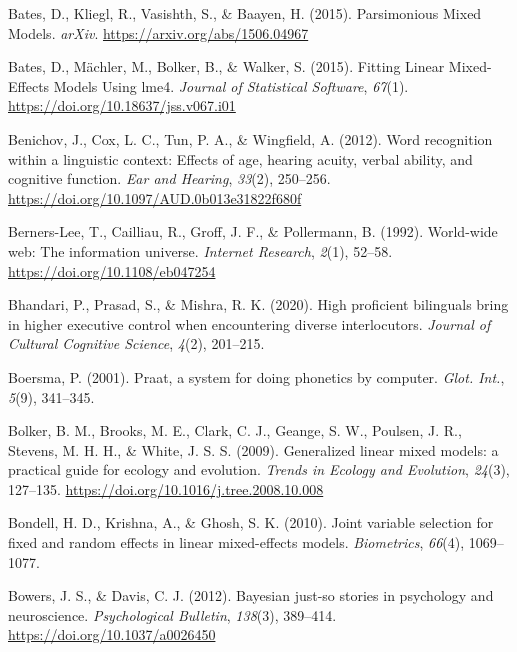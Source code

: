 \documentclass[a4paper, nobind]{templates/ociamthesis}
\newlength{\cslhangindent}
\newenvironment{CSLReferences}[2] %
 {%
  \setlength{\parindent}{0pt}
  \ifodd #1
  \let\oldpar\par
  \def\par{\hangindent=\cslhangindent\oldpar}
  \fi
  \setlength{\parskip}{1mm}
  \setlength{\baselineskip}{6mm}
 }%
 {}
\begin{document}
\begin{CSLReferences}{1}{0}
\leavevmode{}%
Bates, D., Kliegl, R., Vasishth, S., \& Baayen, H. (2015). {Parsimonious Mixed Models}. \emph{arXiv}. \url{https://arxiv.org/abs/1506.04967}

\leavevmode{}%
Bates, D., Mächler, M., Bolker, B., \& Walker, S. (2015). Fitting Linear Mixed-Effects Models Using lme4. \emph{Journal of Statistical Software}, \emph{67}(1). \url{https://doi.org/10.18637/jss.v067.i01}

\leavevmode{}%
Benichov, J., Cox, L. C., Tun, P. A., \& Wingfield, A. (2012). {Word recognition within a linguistic context: Effects of age, hearing acuity, verbal ability, and cognitive function}. \emph{Ear and Hearing}, \emph{33}(2), 250--256. \url{https://doi.org/10.1097/AUD.0b013e31822f680f}

\leavevmode{}%
Berners-Lee, T., Cailliau, R., Groff, J. F., \& Pollermann, B. (1992). {World-wide web: The information universe}. \emph{Internet Research}, \emph{2}(1), 52--58. \url{https://doi.org/10.1108/eb047254}

\leavevmode{}%
Bhandari, P., Prasad, S., \& Mishra, R. K. (2020). High proficient bilinguals bring in higher executive control when encountering diverse interlocutors. \emph{Journal of Cultural Cognitive Science}, \emph{4}(2), 201--215.

\leavevmode{}%
Boersma, P. (2001). Praat, a system for doing phonetics by computer. \emph{Glot. Int.}, \emph{5}(9), 341--345.

\leavevmode{}%
Bolker, B. M., Brooks, M. E., Clark, C. J., Geange, S. W., Poulsen, J. R., Stevens, M. H. H., \& White, J. S. S. (2009). {Generalized linear mixed models: a practical guide for ecology and evolution}. \emph{Trends in Ecology and Evolution}, \emph{24}(3), 127--135. \url{https://doi.org/10.1016/j.tree.2008.10.008}

\leavevmode{}%
Bondell, H. D., Krishna, A., \& Ghosh, S. K. (2010). Joint variable selection for fixed and random effects in linear mixed-effects models. \emph{Biometrics}, \emph{66}(4), 1069--1077.

\leavevmode{}%
Bowers, J. S., \& Davis, C. J. (2012). {Bayesian just-so stories in psychology and neuroscience}. \emph{Psychological Bulletin}, \emph{138}(3), 389--414. \url{https://doi.org/10.1037/a0026450}


\end{CSLReferences}
\end{document}
